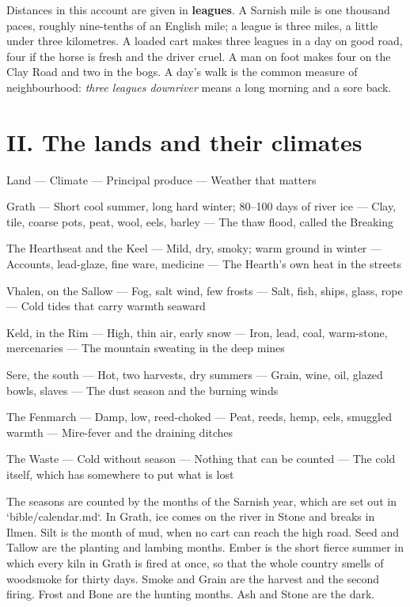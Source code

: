 \documentclass{design/chronicle}
\begin{document}
Distances in this account are given in \textbf{leagues}. A Sarnish mile is one thousand paces, roughly nine-tenths of an English mile; a league is three miles, a little under three kilometres. A loaded cart makes three leagues in a day on good road, four if the horse is fresh and the driver cruel. A man on foot makes four on the Clay Road and two in the bogs. A day’s walk is the common measure of neighbourhood: \emph{three leagues downriver} means a long morning and a sore back.

\CRrule

\section*{II. The lands and their climates}

Land — Climate — Principal produce — Weather that matters\par

Grath — Short cool summer, long hard winter; 80–100 days of river ice — Clay, tile, coarse pots, peat, wool, eels, barley — The thaw flood, called the Breaking\par

The Hearthseat and the Keel — Mild, dry, smoky; warm ground in winter — Accounts, lead-glaze, fine ware, medicine — The Hearth’s own heat in the streets\par

Vhalen, on the Sallow — Fog, salt wind, few frosts — Salt, fish, ships, glass, rope — Cold tides that carry warmth seaward\par

Keld, in the Rim — High, thin air, early snow — Iron, lead, coal, warm-stone, mercenaries — The mountain sweating in the deep mines\par

Sere, the south — Hot, two harvests, dry summers — Grain, wine, oil, glazed bowls, slaves — The dust season and the burning winds\par

The Fenmarch — Damp, low, reed-choked — Peat, reeds, hemp, eels, smuggled warmth — Mire-fever and the draining ditches\par

The Waste — Cold without season — Nothing that can be counted — The cold itself, which has somewhere to put what is lost\par

The seasons are counted by the months of the Sarnish year, which are set out in `bible/calendar.md`. In Grath, ice comes on the river in Stone and breaks in Ilmen. Silt is the month of mud, when no cart can reach the high road. Seed and Tallow are the planting and lambing months. Ember is the short fierce summer in which every kiln in Grath is fired at once, so that the whole country smells of woodsmoke for thirty days. Smoke and Grain are the harvest and the second firing. Frost and Bone are the hunting months. Ash and Stone are the dark.
\end{document}
